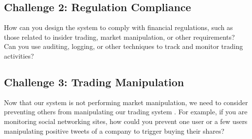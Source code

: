 \documentclass{csse4400}
\begin{document}
\subsection*{Challenge 2: Regulation Compliance}
How can you design the system to comply with financial regulations,
such as those related to insider trading, market manipulation, or other requirements?
Can you use auditing, logging, or other techniques to track and monitor trading activities?

\subsection*{Challenge 3: Trading Manipulation}
Now that our system is not performing market manipulation,
we need to consider preventing others from manipulating our trading system \cite{bot-manipulation}.
For example,
if you are monitoring social networking sites,
how could you prevent one user or a few users manipulating positive tweets of a company to trigger buying their shares?



\end{document}
